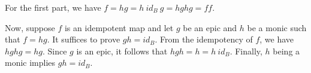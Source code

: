 For the first part, we have $f = hg = h ~ id_B ~ g = h g h g = f f$.

Now, suppose $f$ is an idempotent map and let $g$ be an epic and $h$ be a monic such that $f = hg$. It suffices to prove $gh = id_B$. From the idempotency of $f$, we have $hghg = hg$. Since $g$ is an epic, it follows that $hgh = h = h ~ id_B$. Finally, $h$ being a monic implies $gh = id_B$.
